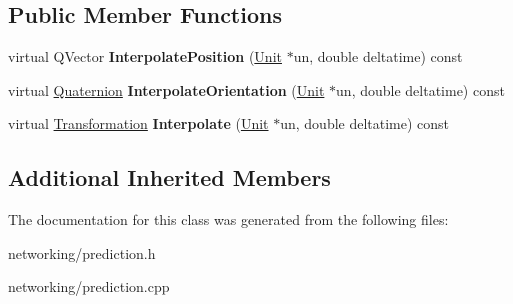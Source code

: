 \subsection*{Public Member Functions}
\begin{DoxyCompactItemize}
\item 
virtual Q\+Vector {\bfseries Interpolate\+Position} (\hyperlink{classUnit}{Unit} $\ast$un, double deltatime) const \hypertarget{classMixedPrediction_a25bbf8663efff47449c9a7be0fba08bd}{}\label{classMixedPrediction_a25bbf8663efff47449c9a7be0fba08bd}

\item 
virtual \hyperlink{structQuaternion}{Quaternion} {\bfseries Interpolate\+Orientation} (\hyperlink{classUnit}{Unit} $\ast$un, double deltatime) const \hypertarget{classMixedPrediction_ad331367cf5ed3cc35095792de8a5320f}{}\label{classMixedPrediction_ad331367cf5ed3cc35095792de8a5320f}

\item 
virtual \hyperlink{structTransformation}{Transformation} {\bfseries Interpolate} (\hyperlink{classUnit}{Unit} $\ast$un, double deltatime) const \hypertarget{classMixedPrediction_a4fcb05b10ca16a8208d86264dc39419e}{}\label{classMixedPrediction_a4fcb05b10ca16a8208d86264dc39419e}

\end{DoxyCompactItemize}
\subsection*{Additional Inherited Members}


The documentation for this class was generated from the following files\+:\begin{DoxyCompactItemize}
\item 
networking/prediction.\+h\item 
networking/prediction.\+cpp\end{DoxyCompactItemize}
